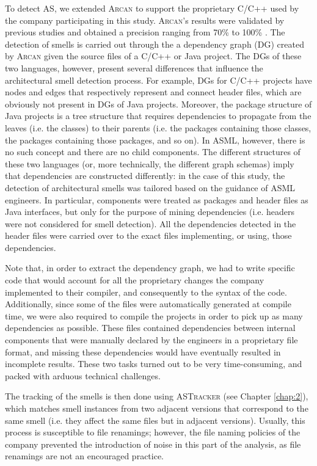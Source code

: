 To detect AS, we extended \textsc{Arcan} to support the proprietary C/C++ used by the company participating in this study. 
\textsc{Arcan}'s results were validated by previous studies and obtained a precision ranging from 70\% to 100\% \cite{Arcelli2020,Arcelli2017}.
The detection of smells is carried out through the a dependency graph (DG) created by \textsc{Arcan} given the source files of a C/C++ or Java project.
The DGs of these two languages, however, present several differences that influence the architectural smell detection process.
For example, DGs for C/C++ projects have nodes and edges that respectively represent and connect header files, which are obviously not present in DGs of Java projects.
Moreover, the package structure of Java projects is a tree structure that requires dependencies to propagate from the leaves (i.e. the classes) to their parents (i.e. the packages containing those classes, the packages containing those packages, and so on).
In ASML, however, there is no such concept and there are no child components.
The different structures of these two languages (or, more technically, the different graph schemas) imply that dependencies are constructed differently: in the case of this study, the detection of architectural smells was tailored based on the guidance of ASML engineers.
In particular, components were treated as packages and header files as Java interfaces, but only for the purpose of mining dependencies (i.e. headers were not considered for smell detection).
All the dependencies detected in the header files were carried over to the exact files implementing, or using, those dependencies.

Note that, in order to extract the dependency graph, we had to write specific code that would account for all the proprietary changes the company implemented to their compiler, and consequently to the syntax of the code. 
Additionally, since some of the files were automatically generated at compile time, we were also required to compile the projects in order to pick up as many dependencies as possible. These files contained dependencies between internal components that were manually declared by the engineers in a proprietary file format, and missing these dependencies would have eventually resulted in incomplete results.
These two tasks turned out to be very time-consuming, and packed with arduous technical challenges.

The tracking of the smells is then done using \textsc{ASTracker} (see Chapter \ref{chap:2}), which matches smell instances from two adjacent versions that correspond to the same smell (i.e. they affect the same files but in adjacent versions).
Usually, this process is susceptible to file renamings; however, the file naming policies of the company prevented the introduction of noise in this part of the analysis, as file renamings are not an encouraged practice.

